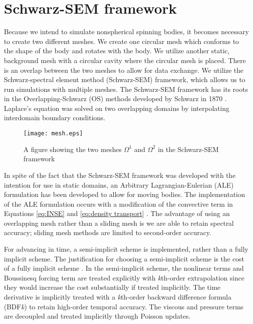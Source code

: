 \section{Schwarz-SEM framework}
\label{section:schwarz-SEM_framework}
Because we intend to simulate nonspherical spinning bodies, it becomes necessary to create two different meshes. We create one circular mesh which conforms to the shape of the body and rotates with the body. We utilize another static, background mesh with a circular cavity where the circular mesh is placed. There is an overlap between the two meshes to allow for data exchange. We utilize the Schwarz-spectral element method (Schwarz-SEM) framework, which allows us to run simulations with multiple meshes. The Schwarz-SEM framework has its roots in the Overlapping-Schwarz (OS) methods developed by Schwarz in 1870 \cite{mittal_nonconforming_2019}. Laplace's equation was solved on two overlapping domains by interpolating interdomain boundary conditions.  

\begin{figure}\centerline{\texttt{[image: mesh.eps]}}
    \caption{A figure showing the two meshes $\Omega^1$ and $\Omega^2$ in the Schwarz-SEM framework}
    \label{fig:mesh}
\end{figure}

In spite of the fact that the Schwarz-SEM framework was developed with the intention for use in static domains, an Arbitrary Lagrangian-Eulerian (ALE) formulation has been developed to allow for moving bodies. The implementation of the ALE formulation occurs with a modification of the convective term in Equations \ref{eq:INSE} and \ref{eq:density transport} \cite{merrill_moving_2019}. The advantage of using an overlapping mesh rather than a sliding mesh is we are able to retain spectral accuracy; sliding mesh methods are limited to second-order accuracy.

For advancing in time, a semi-implicit scheme is implemented, rather than a fully implicit scheme. The justification for choosing a semi-implicit scheme is the cost of a fully implicit scheme \cite{tomboulides_numerical_1997}. In the semi-implicit scheme, the nonlinear terms and Boussinesq forcing term are treated explicitly with \textit{k}th-order extrapolation since they would increase the cost substantially if treated implicitly. The time derivative is implicitly treated with a \textit{k}th-order backward difference formula (BDF\textit{k}) to retain high-order temporal accuracy. The viscous and pressure terms are decoupled and treated implicitly through Poisson updates.

